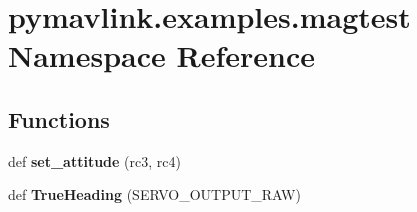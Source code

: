 \hypertarget{namespacepymavlink_1_1examples_1_1magtest}{}\section{pymavlink.\+examples.\+magtest Namespace Reference}
\label{namespacepymavlink_1_1examples_1_1magtest}
\subsection*{Functions}
\begin{DoxyCompactItemize}
\item 
\mbox{\label{namespacepymavlink_1_1examples_1_1magtest_a85f95abe31f900d634b0c548cb8263cb}} 
def {\bfseries set\+\_\+attitude} (rc3, rc4)
\item 
\mbox{\label{namespacepymavlink_1_1examples_1_1magtest_a5318e4afc641238e99eea2d28a2b4128}} 
def {\bfseries True\+Heading} (S\+E\+R\+V\+O\+\_\+\+O\+U\+T\+P\+U\+T\+\_\+\+R\+AW)
\end{DoxyCompactItemize}
